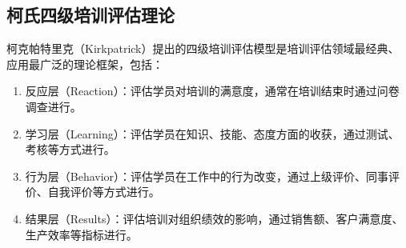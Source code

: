 \subsection{柯氏四级培训评估理论}

柯克帕特里克（Kirkpatrick）提出的四级培训评估模型是培训评估领域最经典、应用最广泛的理论框架，包括：

\begin{enumerate}
    \item 反应层（Reaction）：评估学员对培训的满意度，通常在培训结束时通过问卷调查进行。
    \item 学习层（Learning）：评估学员在知识、技能、态度方面的收获，通过测试、考核等方式进行。
    \item 行为层（Behavior）：评估学员在工作中的行为改变，通过上级评价、同事评价、自我评价等方式进行。
    \item 结果层（Results）：评估培训对组织绩效的影响，通过销售额、客户满意度、生产效率等指标进行。
\end{enumerate}
